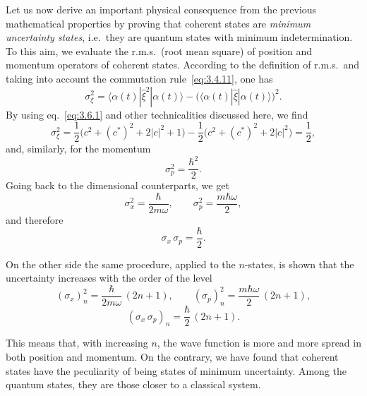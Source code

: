 Let us now derive an important physical consequence from the
previous mathematical properties by proving that coherent states are
\emph{minimum uncertainty states}, i.e.\ they are quantum states
with minimum indetermination. To this aim, we evaluate the r.m.s.\
(root mean square) of position and momentum operators of coherent
states. According to the definition of r.m.s.\ and taking into
account the commutation rule~\eqref{eq:3.4.11}, one has
\begin{equation}
\sigma_\xi^2=
\langle\alpha(t)|\hat\xi^2|\alpha(t)\rangle-
\bigl(\langle\alpha(t)|\hat\xi|\alpha(t)\rangle\bigr)^2.
\label{eq:3.6.14}
\end{equation}
By using eq.~\eqref{eq:3.6.1} and other technicalities discussed
here, we find
\begin{equation}
\sigma_\xi^2=\frac{1}{2}\bigl(c^2+(c^*)^2+2|c|^2+1\bigr)
-\frac{1}{2}\bigl(c^2+(c^*)^2+2|c|^2\bigr)=\frac{1}{2},
\label{eq:3.6.15}
\end{equation}
and, similarly, for the momentum
\begin{equation}
\sigma_p^2=\frac{\hbar^2}{2}.
\label{eq:3.6.16}
\end{equation}
Going back to the dimensional counterparts, we get
\begin{equation}
\sigma_x^2=\frac{\hbar}{2m\omega},\qquad
\sigma_p^2=\frac{m\hbar\omega}{2},
\label{eq:3.6.17}
\end{equation}
and therefore
\begin{equation}
\sigma_x\,\sigma_p=\frac{\hbar}{2}.
\label{eq:3.6.18}
\end{equation}

On the other side the same procedure, applied to the $n$-states,
is shown that the uncertainty increases with the order of the level
\begin{equation}
(\sigma_x)_n^2=\frac{\hbar}{2m\omega}\,(2n+1),\qquad
(\sigma_p)_n^2=\frac{m\hbar\omega}{2}\,(2n+1),
\label{eq:3.6.19}
\end{equation}
\begin{equation}
(\sigma_x\,\sigma_p)_n=\frac{\hbar}{2}\,(2n+1).
\label{eq:3.6.20}
\end{equation}

This means that, with increasing $n$, the wave function is more
and more spread in both position and momentum. On the contrary, we
have found that coherent states have the peculiarity of being states
of minimum uncertainty. Among the quantum states, they are those
closer to a classical system.

